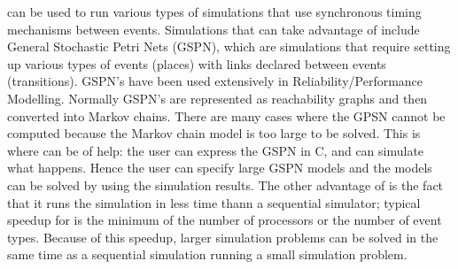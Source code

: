\dispare can be used to run various types of simulations
that use synchronous timing mechanisms between events.  Simulations that
can take advantage of \dispare include General Stochastic Petri Nets
(GSPN), which are simulations that require setting up various types of
events (places) with links declared between events (transitions). GSPN's
have been used extensively in Reliability/Performance Modelling.
Normally GSPN's are represented as reachability graphs and then 
converted into  Markov chains.  There are many cases where the GPSN
cannot be computed because the Markov chain model is too large to be
solved.  This is where \dispare can be of help:  the user can express
the GSPN in C, and 
\dispare can simulate what happens. Hence the user can specify
large GSPN models and the models can be solved by using the simulation
results. The other advantage of \dispare is the fact that it runs the
simulation in less time thann a sequential simulator; typical speedup
for \dispare is the minimum of the number of processors or the number of
event types. Because of this
speedup, larger simulation problems can be solved in the same time as a
sequential simulation running a small simulation problem.
